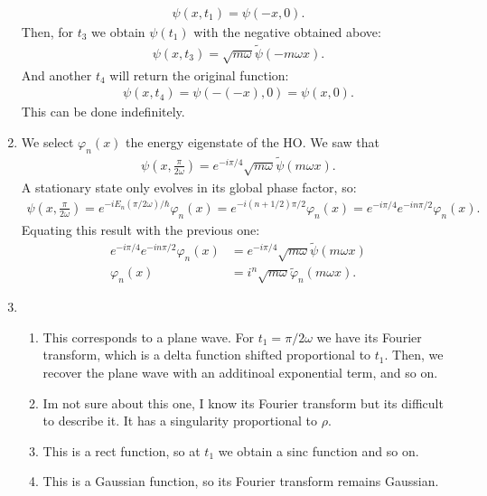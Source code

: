 \documentclass[letterpaper,11pt,twoside]{article}
\begin{document}
\begin{enumerate}[itemsep=0pt,topsep=0pt,label=\alph*)]
\begin{align*}
    \psi(x,t_1)=\psi(-x,0).
  \end{align*}
  Then, for $t_3$ we obtain $\psi(t_1)$ with the negative obtained above:
  \begin{align*}
    \psi(x,t_3)=\sqrt{m\omega}\tilde{\psi}(-m\omega x).
  \end{align*}
  And another $t_4$ will return the original function:
  \begin{align*}
    \psi(x,t_4)=\psi(-(-x),0)=\psi(x,0).
  \end{align*}
  This can be done indefinitely.
  \item We select $\varphi_n(x)$ the energy eigenstate of the HO. We saw that 
  \begin{align*}
    \psi(x,\frac{\pi}{2\omega})=e^{-i\pi/4}\sqrt{m\omega}\tilde{\psi}(m\omega x).
  \end{align*}
  A stationary state only evolves in its global phase factor, so:
  \begin{align*}
    \psi(x,\frac{\pi}{2\omega})=e^{-iE_n(\pi/2\omega)/\hbar}\varphi_n(x)=e^{-i(n+1/2)\pi/2}\varphi_n(x)=e^{-i\pi/4}e^{-in\pi/2}\varphi_n(x).
  \end{align*}
  Equating this result with the previous one:
  \begin{align*}
    e^{-i\pi/4}e^{-in\pi/2}\varphi_n(x)&=e^{-i\pi/4}\sqrt{m\omega}\tilde{\psi}(m\omega x)\\
    \varphi_n(x)&=i^n\sqrt{m\omega}\tilde{\varphi}_n(m\omega x).
  \end{align*}
  \item 
  \begin{enumerate}[itemsep=0pt,topsep=0pt,label=\roman*)]
    \item This corresponds to a plane wave. For $t_1=\pi/2\omega$ we have its Fourier transform, which is a delta function shifted proportional to $t_1$. Then, 
    we recover the plane wave with an additinoal exponential term, and so on.
    \item Im not sure about this one, I know its Fourier transform but its difficult to describe it. It has a singularity proportional to $\rho$.
    \item This is a rect function, so at $t_1$ we obtain a sinc function and so on.
    \item This is a Gaussian function, so its Fourier transform remains Gaussian.
  \end{enumerate}
\end{enumerate}
\end{document}

